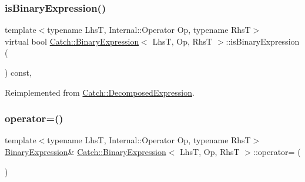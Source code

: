 \mbox{\label{class_catch_1_1_binary_expression_a4c617c0b6a73a9cafbbf900909c7c258}} 
\subsubsection{\texorpdfstring{is\+Binary\+Expression()}{isBinaryExpression()}}
{\footnotesize\ttfamily template$<$typename LhsT, Internal\+::\+Operator Op, typename RhsT$>$ \\
virtual bool \mbox{\hyperlink{class_catch_1_1_binary_expression}{Catch\+::\+Binary\+Expression}}$<$ LhsT, Op, RhsT $>$\+::is\+Binary\+Expression (\begin{DoxyParamCaption}{ }\end{DoxyParamCaption}) const\hspace{0.3cm}{\ttfamily [inline]}, {\ttfamily [virtual]}}



Reimplemented from \mbox{\hyperlink{struct_catch_1_1_decomposed_expression_a1c458ece47b71f093290dbdf9bb31fdb}{Catch\+::\+Decomposed\+Expression}}.

\mbox{\label{class_catch_1_1_binary_expression_a2147a858eb5866e5643d0ef321064aa1}} 
\subsubsection{\texorpdfstring{operator=()}{operator=()}}
{\footnotesize\ttfamily template$<$typename LhsT, Internal\+::\+Operator Op, typename RhsT$>$ \\
\mbox{\hyperlink{class_catch_1_1_binary_expression}{Binary\+Expression}}\& \mbox{\hyperlink{class_catch_1_1_binary_expression}{Catch\+::\+Binary\+Expression}}$<$ LhsT, Op, RhsT $>$\+::operator= (\begin{DoxyParamCaption}\item[{\mbox{\hyperlink{class_catch_1_1_binary_expression}{Binary\+Expression}}$<$ LhsT, Op, RhsT $>$ \&}]{ }\end{DoxyParamCaption})}

